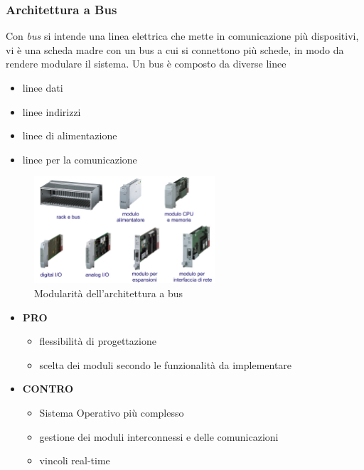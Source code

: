 \documentclass[10pt, letterpaper]{report}
\begin{document}
\subsubsection{Architettura a Bus}
Con \textit{bus} si intende una linea elettrica che mette in comunicazione più dispositivi, vi è una scheda madre 
con un bus a cui si connettono più schede, in modo da rendere modulare il sistema. Un bus è composto da diverse 
linee\begin{itemize}
    \item linee dati 
    \item linee indirizzi 
    \item linee di alimentazione 
    \item linee per la comunicazione
\end{itemize}
\begin{figure}[h!]
    \centering
    \includegraphics[width=0.6\textwidth ]{images/bus.png}
    \caption{Modularità dell'architettura a bus}
\end{figure}
\begin{itemize}
    \item \textbf{PRO}\begin{itemize}
        \item flessibilità di progettazione 
        \item scelta dei moduli secondo le funzionalità da implementare
    \end{itemize}
    \item \textbf{CONTRO}\begin{itemize}
        \item Sistema Operativo più complesso
        \item  gestione dei moduli interconnessi e delle comunicazioni
        \item  vincoli real-time  
    \end{itemize}
\end{itemize}
\end{document}
